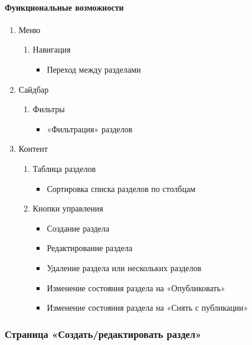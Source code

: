 \paragraph{Функциональные возможности}
\begin{enumerate}
  \item Меню
  \begin{enumerate}
    \item Навигация
    \begin{itemize}
      \item Переход между разделами
    \end{itemize}
  \end{enumerate}

  \item Сайдбар
  \begin{enumerate}
    \item Фильтры
    \begin{itemize}
      \item «Фильтрация» разделов
    \end{itemize}
  \end{enumerate}

  \item Контент
    \begin{enumerate}
      \item Таблица разделов
      \begin{itemize}
        \item Сортировка списка разделов по столбцам
      \end{itemize}

      \item Кнопки управления
        \begin{itemize}
          \item Создание раздела
          \item Редактирование раздела
          \item Удаление раздела или нескольких разделов
          \item Изменение состояния раздела на «Опубликовать»
          \item Изменение состояния раздела на «Снять с публикации»
        \end{itemize}
    \end{enumerate}
\end{enumerate}

\subsubsection{Страница «Создать/редактировать раздел»}
